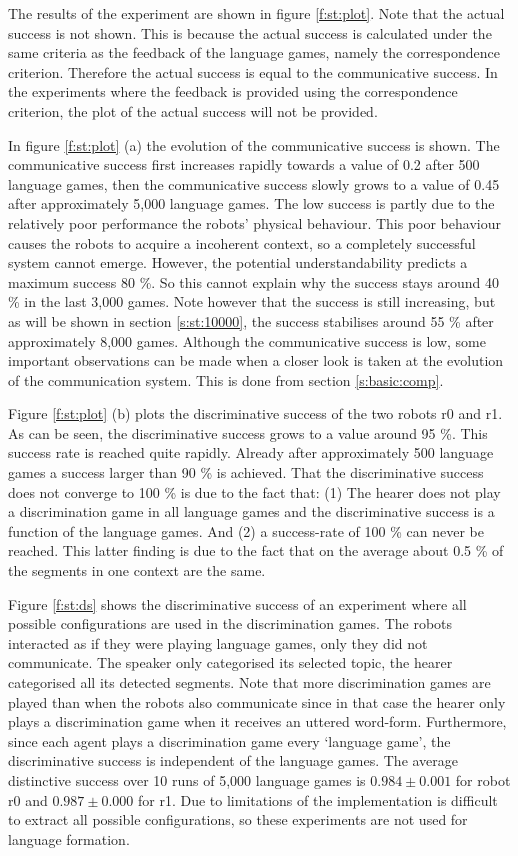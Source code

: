 The results of the experiment are shown in figure \ref{f:st:plot}. Note that the actual success is not shown. This is because the actual success is calculated under the same criteria as the feedback of the language games, namely the correspondence criterion. Therefore the actual success is equal to the communicative success. In the experiments where the feedback is provided using the correspondence criterion, the plot of the actual success will not be provided.

In figure \ref{f:st:plot} (a) the evolution of the communicative success is shown. The communicative success first increases rapidly towards a value of 0.2 after 500 language games, then the communicative success slowly grows to a value of 0.45 after approximately 5,000 language games. The low success is partly due to the relatively poor performance the robots' physical behaviour. This poor behaviour causes the robots to acquire a incoherent context, so a completely successful system cannot emerge. However, the potential understandability predicts a maximum success 80 \%. So this cannot explain why the success stays around 40 \% in the last 3,000 games. Note however that the success is still increasing, but as will be shown in section \ref{s:st:10000}, the success stabilises around 55 \% after approximately 8,000 games. Although the communicative success is low, some important observations can be made when a closer look is taken at the evolution of the communication system. This is done from section \ref{s:basic:comp}.

Figure \ref{f:st:plot} (b) plots the discriminative success of the two robots r0 and r1. As can be seen, the discriminative success grows to a value around 95 \%. This success rate is reached quite rapidly. Already after approximately 500 language games a success larger than 90 \% is achieved. That the discriminative success does not converge to 100 \% is due to the fact that: (1) The hearer does not play a discrimination game in all language games and the discriminative success is a function of the language games. And (2) a success-rate of 100 \% can never be reached. This latter finding is due to the fact that on the average about 0.5 \% of the segments in one context are the same. 

Figure \ref{f:st:ds} shows the discriminative success of an experiment where all possible configurations are used in the discrimination games. The robots interacted as if they were playing language games, only they did not communicate. The speaker only categorised its selected topic, the hearer categorised all its detected segments. Note that more discrimination games are played than when the robots also communicate since in that case the hearer only plays a discrimination game when it receives an uttered word-form. Furthermore, since each agent plays a discrimination game every `language game', the discriminative success is independent of the language games. The average distinctive success over 10 runs of 5,000 language games is $0.984 \pm 0.001$ for robot r0 and $0.987 \pm 0.000$ for r1. Due to limitations of the implementation is difficult to extract all possible configurations, so these experiments are not used for language formation.

